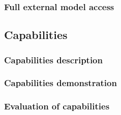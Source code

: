 \documentclass{article}
\begin{document}
\subsubsection{Full external model access}



\subsection{Capabilities}
\subsubsection{Capabilities description}


\subsubsection{Capabilities demonstration}

\subsubsection{Evaluation of capabilities}
\end{document}

